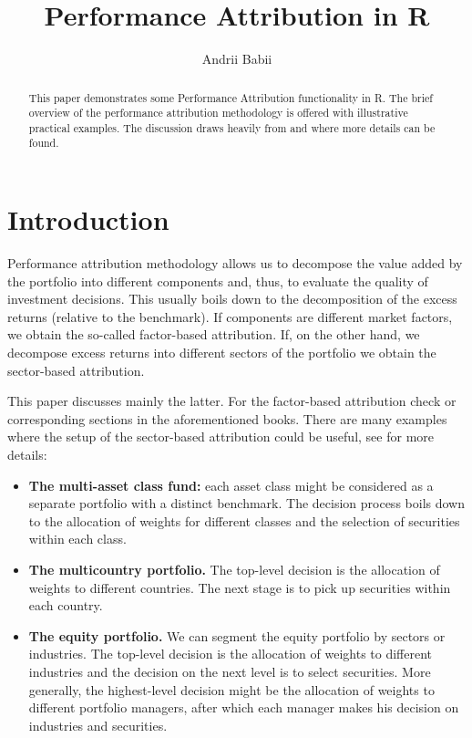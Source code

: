 \documentclass[11pt,a4paper]{article}
\begin{document}
\title{Performance Attribution in R}
\author{Andrii Babii}
\maketitle
\begin{abstract}
This paper demonstrates some Performance Attribution functionality in R. The brief overview of the performance attribution methodology is offered with illustrative practical examples. The discussion draws heavily from \cite{christopherson2009portfolio} and \cite{bacon2008practical} where more details can be found.
\end{abstract}

\section{Introduction}
Performance attribution methodology allows us to decompose the value added by the portfolio into different components and, thus, to evaluate the quality of investment decisions. This usually boils down to the decomposition of the excess returns (relative to the benchmark). If components are different market factors, we obtain the so-called factor-based attribution. If, on the other hand, we decompose excess returns into different sectors of the portfolio we obtain the sector-based attribution.

This paper discusses mainly the latter. For the factor-based attribution check \cite{fama1972components} or corresponding sections in the aforementioned books. There are many examples where the setup of the sector-based attribution could be useful, see \cite{christopherson2009portfolio} for more details:
\begin{itemize}
  \item \textbf{The multi-asset class fund:} each asset class might be considered as a separate portfolio with a distinct benchmark. The decision process boils down to the allocation of weights for different classes and the selection of securities within each class.
  \item \textbf{The multicountry portfolio.} The top-level decision is the allocation of weights to different countries. The next stage is to pick up securities within each country.
  \item \textbf{The equity portfolio.} We can segment the equity portfolio by sectors or industries. The top-level decision is the allocation of weights to different industries and the decision on the next level is to select securities. More generally, the highest-level decision might be the allocation of weights to different portfolio managers, after which each manager makes his decision on industries and securities.
\end{itemize}
\end{document}
